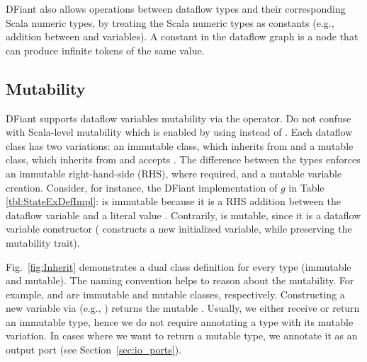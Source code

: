 DFiant also allows operations between dataflow types and their corresponding Scala numeric types, by treating the Scala numeric types as constants (e.g., addition between  and  variables). A constant in the dataflow graph is a node that can produce infinite tokens of the same value.   

\subsection{Mutability}
\label{sec:mutability}
DFiant supports dataflow variables mutability via the \code{:=} operator. Do not confuse with Scala-level mutability which is enabled by using  instead of . Each dataflow class has two variations: an immutable class, which inherits from  and a mutable class, which inherits from  and accepts \code{:=}. The difference between the types enforces an immutable right-hand-side (RHS), where required, and a mutable variable creation. Consider, for instance, the DFiant implementation of $g$ in Table \ref{tbl:StateExDefImpl}:  is immutable because it is a RHS addition between the dataflow variable  and a literal value . Contrarily,  is mutable, since it is a dataflow variable constructor ( constructs a new initialized variable, while preserving the mutability trait). 

Fig.~\ref{fig:Inherit} demonstrates a dual class definition for every type  (immutable and mutable). The naming convention helps to reason about the mutability. For example,  and  are immutable and mutable classes, respectively. Constructing a new variable via  (e.g., ) returns the mutable . Usually, we either receive or return an immutable type, hence we do not require annotating a type with its mutable variation. In cases where we want to return a mutable type, we annotate it as an output port (see Section~\ref{sec:io_ports}).



